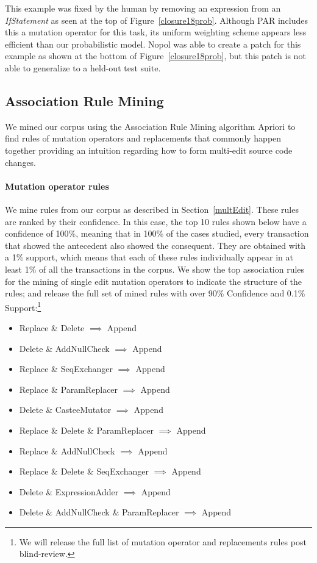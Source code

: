\documentclass[conference]{IEEEtran}
\begin{document}
This example was fixed by the human by removing an expression from an
\emph{IfStatement} as seen at the top of Figure~\ref{closure18prob}. 
Although PAR includes this a mutation operator for this task, its uniform
weighting scheme appears less efficient than our probabilistic model. Nopol was
able to create a patch for this example as shown at the bottom of 
Figure~\ref{closure18prob}, but this patch is not able to generalize to a
held-out test suite.

\subsection{Association Rule Mining} \label{armRes}

We mined our corpus using the Association Rule Mining algorithm Apriori 
to find rules of mutation operators and 
replacements that commonly happen together providing an intuition regarding
how to form multi-edit
source code changes.

\paragraph{Mutation operator rules}
We mine rules from our corpus as described in Section~\ref{multEdit}.  
These rules are ranked by their confidence. In this case, the top 10 rules shown
below have a confidence of 100\%, meaning that in 100\% of the cases
studied, every transaction that showed the antecedent also showed the consequent.
They are obtained with a 1\% support, which means that each of these rules
individually appear in at least 1\% of all the transactions in the
corpus. We show the top association rules for the mining of single edit 
mutation operators to indicate the structure of the rules; and release the full set of mined
rules with over 90\% Confidence and 0.1\% Support:\footnote{We will release the full list of mutation operator and replacements rules post blind-review.} %


\begin{itemize}
 \item Replace \& Delete $\implies$ Append
 \item Delete \& AddNullCheck $\implies$ Append
 \item Replace \& SeqExchanger $\implies$ Append
 \item Replace \& ParamReplacer $\implies$ Append
 \item Delete \& CasteeMutator $\implies$ Append
 \item Replace \& Delete \& ParamReplacer $\implies$ Append
 \item Replace \& AddNullCheck $\implies$ Append
 \item Replace \& Delete \& SeqExchanger $\implies$ Append
 \item Delete \& ExpressionAdder $\implies$ Append
 \item Delete \& AddNullCheck \& ParamReplacer $\implies$ Append
\end{itemize}
\end{document}

